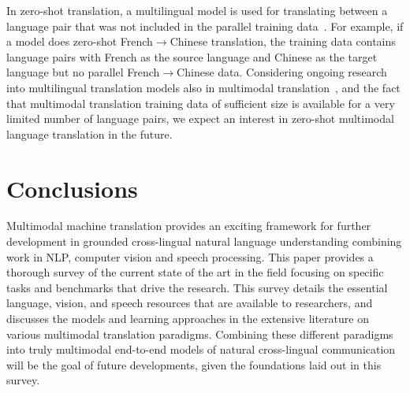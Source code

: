\documentclass{svjour3}
\newcommand{\eg}[1]{\textit{e.g.}~#1}
\newcommand{\lp}[2]{#1$\rightarrow$#2}
\begin{document}
In zero-shot translation, a multilingual model is used for translating between a language pair that was not included in the parallel training data~\citep{firat-etal-2016-zero,johnson-googles-2016}.
For example, if a model does zero-shot \lp{French}{Chinese} translation,
the training data contains language pairs with French as the source language and Chinese as the target language but no parallel \lp{French}{Chinese} data.
Considering ongoing research into multilingual translation models also in multimodal translation~\citep[\eg{}][]{inaguma2019multilingual},
and the fact that multimodal translation training data of sufficient size is available for a very limited number of language pairs,
we expect an interest in zero-shot multimodal language translation in the future.


























































%
 


\section{Conclusions}
\label{sec:conclusions}


Multimodal machine translation provides an exciting framework for further development in grounded cross-lingual natural language understanding combining work in NLP, computer vision and speech processing. This paper provides a thorough survey of the current state of the art in the field focusing on specific tasks and benchmarks that drive the research. This survey details the essential language, vision, and speech resources that are available to researchers, and discusses the models and learning approaches in the extensive literature on various multimodal translation paradigms. Combining these different paradigms into truly multimodal end-to-end models of natural cross-lingual communication will be the goal of future developments, given the foundations laid out in this survey.
 
\end{document}
